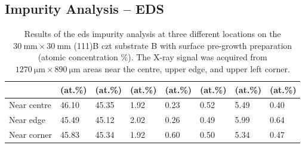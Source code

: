 
\subsection{Impurity Analysis -- EDS}


\begin{table}[htbp]
    \centering
    \caption[\Ac{eds} impurity analysis of substrate B with surface pre-growth preparation.]{Results of the \ac{eds} impurity analysis at three different locations on the $\SI{30}{\milli\metre}\times\SI{30}{\milli\metre}$ (111)B \ac{czt} substrate B with surface pre-growth preparation (atomic concentration \%). The X-ray signal was acquired from $\SI{1270}{\micro\metre}\times\SI{890}{\micro\metre}$ areas near the centre, upper edge, and upper left corner.}\label{tab:subBb_eds_analysis}
    \begin{tabu} to 1.0\textwidth { X[1.85,r] X[1.125,c] X[1.125,c] X[1.125,c] X[1.125,c] X[1.125,c] X[1.125,c] X[1.125,c] }
    \hline
         & \textbf{} (at.\%) & \textbf{} (at.\%) & \textbf{} (at.\%) & \textbf{ } (at.\%) & \textbf{} (at.\%) & \textbf{} (at.\%) & \textbf{} (at.\%) \\
        \hline
        Near centre  & \SI{46.10}{} & \SI{45.35}{} & \SI{1.92}{} & \SI{0.23}{} & \SI{0.52}{} & \SI{5.49}{} & \SI{0.40}{} \\ %
        Near edge & \SI{45.49}{} & \SI{45.12}{} & \SI{2.02}{} & \SI{0.26}{} & \SI{0.49}{} & \SI{5.99}{} & \SI{0.64}{} \\ %
        Near corner & \SI{45.83}{} & \SI{45.34}{} & \SI{1.92}{} & \SI{0.60}{} & \SI{0.50}{} & \SI{5.34}{} & \SI{0.47}{} \\ %
         \hline
    \end{tabu}
\end{table}


